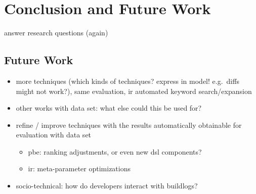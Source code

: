 \documentclass[\myrootdir/main.tex]{subfiles}
\begin{document}
\chapter{Conclusion and Future Work}
\label{sec:conclusion}
answer research questions (again)

\section*{Future Work}
\label{sec:fw}
\begin{itemize}
  \item more techniques (which kinds of techniques? express in model! e.g.\ diffs might not work?), same evaluation, ir automated keyword search/expansion
  \item other works with data set: what else could this be used for?
  \item refine / improve techniques with the results automatically obtainable for evaluation with data set
    \begin{itemize}
      \item pbe: ranking adjustments, or even new dsl components?
      \item ir: meta-parameter optimizations
    \end{itemize}
  \item socio-technical: how do developers interact with buildlogs?
\end{itemize}
\end{document}
